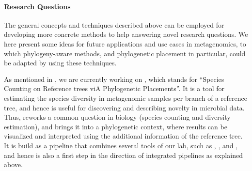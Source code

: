 \paragraph{Research Questions}
\label{ch:ConclusionOutlook:par:ResearchQuestions}


The general concepts and techniques described above %
can be employed for developing more concrete methods to help answering novel research questions.
We here present some ideas for future applications and use cases in metagenomics,
to which phylogeny-aware methods, and phylogenetic placement in particular, could be adapted
by using these techniques.

As mentioned in , we are currently working on ,
which stands for ``Species Counting on Reference trees viA Phylogenetic Placements''.
It is a tool for estimating the species diversity in metagenomic samples per branch of a reference tree,
and hence is useful for discovering and describing novelty in microbial data.
Thus,  reworks a common question in biology (species counting and diversity estimation),
and brings it into a phylogenetic context,
where results can be visualized and interpreted using the additional information of the reference tree.
It is build as a pipeline that combines several tools of our lab, such as
 \cite{Barbera2018},  \cite{Morel2018}, and  \cite{Kapli2017},
and hence is also a first step in the direction of integrated pipelines as explained above.


